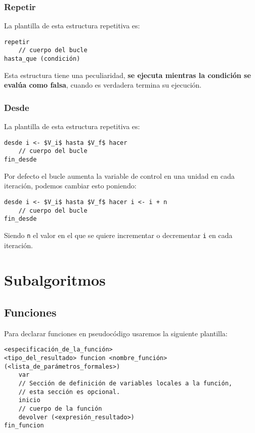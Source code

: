 \documentclass{article}
\begin{document}
\subsubsection{Repetir}
La plantilla de esta estructura repetitiva es:

\begin{lstlisting}[language = pseudocodigoesp]
repetir
    // cuerpo del bucle
hasta_que (condición)
\end{lstlisting}

Esta estructura tiene una peculiaridad, \textbf{se ejecuta mientras la condición se evalúa como falsa}, cuando es verdadera termina su ejecución.

\subsubsection{Desde}

La plantilla de esta estructura repetitiva es:

\begin{lstlisting}[language = pseudocodigoesp, mathescape=true]
desde i <- $V_i$ hasta $V_f$ hacer
    // cuerpo del bucle
fin_desde
\end{lstlisting}

Por defecto el bucle  aumenta la variable de control en una unidad en cada iteración, podemos cambiar esto poniendo:

\begin{lstlisting}[language = pseudocodigoesp, mathescape=true]
desde i <- $V_i$ hasta $V_f$ hacer i <- i + n
    // cuerpo del bucle
fin_desde
\end{lstlisting}

Siendo \texttt{n} el valor en el que se quiere incrementar o decrementar \texttt{i} en cada iteración.

\section{Subalgoritmos}

\subsection{Funciones}

Para declarar funciones en pseudocódigo usaremos la siguiente plantilla:

\begin{lstlisting}[language = pseudocodigoesp]
<especificación_de_la_función>
<tipo_del_resultado> funcion <nombre_función> (<lista_de_parámetros_formales>)
    var
    // Sección de definición de variables locales a la función,
    // esta sección es opcional.
    inicio
    // cuerpo de la función
    devolver (<expresión_resultado>)
fin_funcion
\end{lstlisting}
\end{document}
